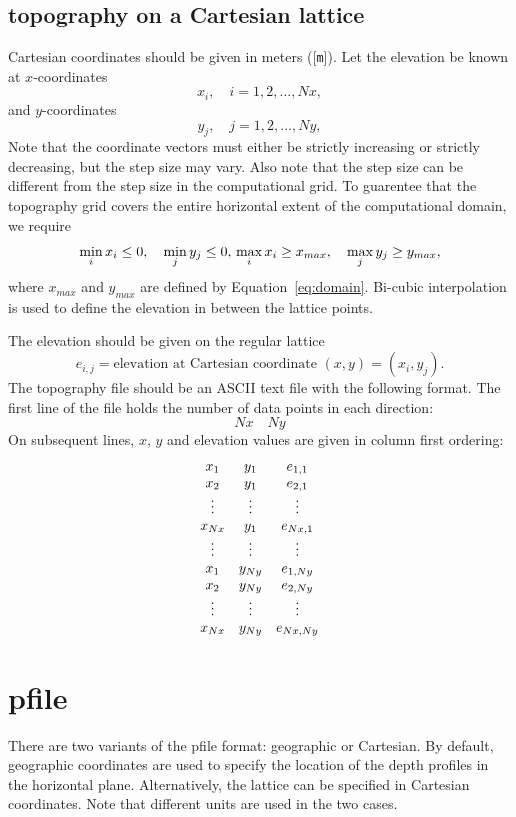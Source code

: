 \documentclass[11pt]{report}
\begin{document}
\subsection{topography on a Cartesian lattice}
Cartesian coordinates should be given in meters ([{\tt m}]). Let the elevation be known at $x$-coordinates
\[
x_i,\quad i=1,2,\ldots,Nx,
\]
and $y$-coordinates
\[
y_j,\quad j=1,2,\ldots,Ny,
\]
Note that the coordinate vectors must either be strictly increasing or strictly
decreasing, but the step size may vary. Also note that the step size can be different from the step
size in the computational grid. To guarentee that the topography grid covers the entire horizontal
extent of the computational domain, we require
\[
\min_i x_i \leq 0,\quad \min_j y_j \leq 0,\\
\max_i x_i \geq x_{max},\quad \max_j y_j \geq y_{max},
\] 
where $x_{max}$ and $y_{max}$ are defined by Equation~\eqref{eq:domain}. Bi-cubic interpolation is
used to define the elevation in between the lattice points.

The elevation should be given on the regular lattice
\[
e_{i,j} = \mbox{elevation at Cartesian coordinate $(x,y)=(x_i, y_j)$.}
\]
The topography file should be an ASCII text file with the following format. The first line of the
file holds the number of data points in each direction:
\[
Nx\quad Ny
\]
On subsequent lines, $x$, $y$ and elevation values are given in column first ordering:
\[
\begin{array}{c c c}
x_1 & y_1& e_{1,1}\\
x_2& y_1& e_{2,1}\\
\vdots&\vdots&\vdots\\
x_{Nx}& y_1& e_{Nx,1}\\
\vdots&\vdots&\vdots\\
x_1 & y_{Ny}& e_{1,Ny}\\
x_2& y_{Ny}& e_{2,Ny}\\
\vdots&\vdots&\vdots\\
x_{Nx}& y_{Ny}& e_{Nx,Ny}
\end{array}
\]

\section{pfile}\label{sec:pfile-format}

There are two variants of the pfile format: geographic or Cartesian. By default, geographic
coordinates are used to specify the location of the depth profiles in the horizontal
plane. Alternatively, the lattice can be specified in Cartesian coordinates. Note that different
units are used in the two cases.
\end{document}
